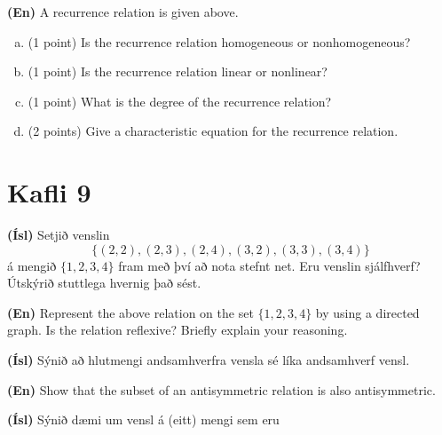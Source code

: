 \documentclass[addpoints]{exam}
\begin{document}
\begin{questions}

\textbf{(En)} A recurrence relation is given above.

\begin{enumerate}[(a)]
 \item (1 point) Is the recurrence relation homogeneous or nonhomogeneous?
 \item (1 point) Is the recurrence relation linear or nonlinear?
 \item (1 point) What is the degree of the recurrence relation?
 \item (2 points) Give a characteristic equation for the recurrence relation.
\end{enumerate}

\section{Kafli 9}

\question[5]
\textbf{(Ísl)} Setjið venslin 
\[
\{(2, 2), (2, 3), (2, 4), (3, 2), (3, 3), (3, 4)\}
\]
á mengið $\{1, 2, 3, 4\}$ fram með því að nota stefnt net. Eru venslin sjálfhverf? Útskýrið stuttlega hvernig það sést.

\textbf{(En)} Represent the above relation on the set $\{1, 2, 3, 4\}$ by using a directed graph. Is the relation reflexive? Briefly explain your reasoning.

\question[10]
\textbf{(Ísl)} Sýnið að hlutmengi andsamhverfra vensla sé líka andsamhverf vensl.

\textbf{(En)} Show that the subset of an antisymmetric relation is also antisymmetric.

\question

\textbf{(Ísl)} Sýnið dæmi um vensl á (eitt) mengi sem eru
\end{questions}
\end{document}
